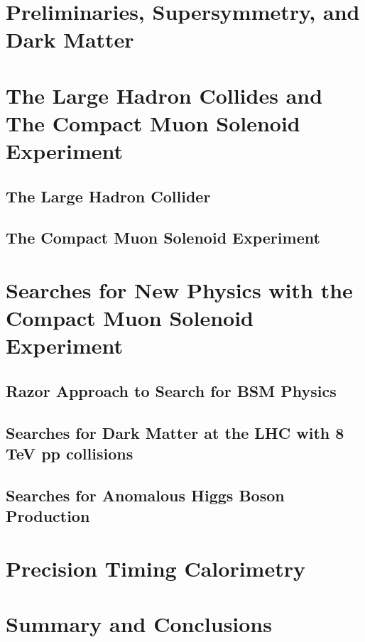 \documentclass[14pt]{caltech_thesis}
\begin{document}
\tableofcontents
\listoffigures
\listoftables
\printnomenclature

\mainmatter
\part{Preliminaries, Supersymmetry, and Dark Matter}

\part{The Large Hadron Collides and The Compact Muon Solenoid Experiment}
\chapter{The Large Hadron Collider}

\chapter{The Compact Muon Solenoid Experiment}

\part{ Searches for New Physics with the Compact Muon Solenoid
  Experiment}

\chapter{Razor Approach to Search for BSM Physics}\label{chapter:razor}

\chapter{Searches for Dark Matter at the LHC with 8 TeV pp collisions}\label{DMatLHC}

\chapter{Searches for Anomalous Higgs Boson Production}\label{HggRazor}

\part{ Precision Timing Calorimetry}

\part{Summary and Conclusions}

\end{document}
